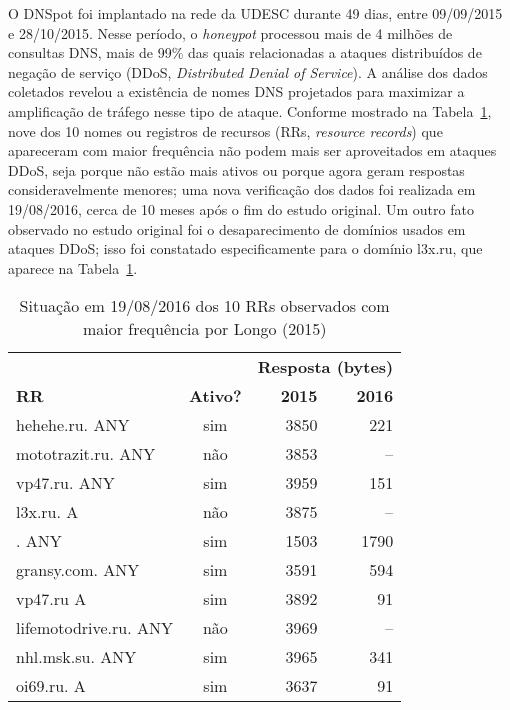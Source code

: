 O DNSpot foi implantado na rede da UDESC durante 49 dias, entre
09/09/2015 e 28/10/2015. Nesse período, o \textit{honeypot} processou
mais de 4 milhões de consultas DNS, mais de 99\% das quais
relacionadas a ataques distribuídos de negação de serviço (DDoS,
\textit{Distributed Denial of Service}). A análise dos dados coletados
revelou a existência de nomes DNS projetados para maximizar a
amplificação de tráfego nesse tipo de ataque. Conforme mostrado na
Tabela~\ref{table:resolvidos1}, nove dos 10 nomes ou registros de
recursos (RRs, \textit{resource records}) que apareceram com maior
frequência não podem mais ser aproveitados em ataques DDoS, seja
porque não estão mais ativos ou porque agora geram respostas
consideravelmente menores; uma nova verificação dos dados foi realizada em
19/08/2016, cerca de 10 meses após o fim do estudo original. Um outro
fato observado no estudo original foi o desaparecimento de domínios
usados em ataques DDoS; isso foi constatado especificamente para o
domínio l3x.ru, que aparece na Tabela~\ref{table:resolvidos1}.

\begin{table}[h!]
    \centering
    \begin{tabular}{|l|c|r|r|}
    \hline
                           &     &
                           \multicolumn{2}{c|}{\textbf{Resposta
                               (bytes)}}\\ \cline{3-4}
    \textbf{RR}& \textbf{Ativo?} & \textbf{2015} & \textbf{2016} \\\hline
     hehehe.ru. ANY        & sim & 3850 & 221\\ \hline
     mototrazit.ru. ANY    & não & 3853 & -- \\ \hline
     vp47.ru. ANY          & sim & 3959 & 151\\\hline
     l3x.ru. A             & não & 3875 & --\\\hline
     . ANY                 & sim & 1503 & 1790\\\hline
     gransy.com. ANY       & sim & 3591 & 594\\\hline
     vp47.ru A             & sim & 3892 & 91\\\hline
     lifemotodrive.ru. ANY & não & 3969 & --\\\hline
     nhl.msk.su. ANY       & sim & 3965 & 341\\\hline
     oi69.ru. A            & sim & 3637 & 91\\\hline
    \end{tabular}
        \caption{Situação em 19/08/2016 dos 10 RRs observados com maior
          frequência por Longo (2015)}
    \label{table:resolvidos1}
\end{table}

